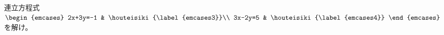連立方程式$\begin{emcases}
2x+3y=-1 & \houteisiki{\label{emcases3}}\\
3x-2y=5 & \houteisiki{\label{emcases4}}
\end{emcases}$を解け。
